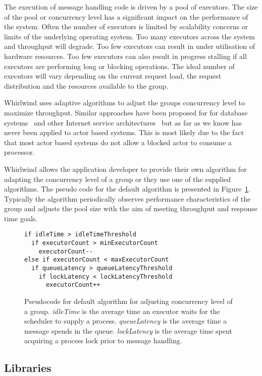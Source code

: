 \documentclass[conference]{IEEEtran}
\begin{document}
The execution of message handling code is driven by a pool of executors. The size of the pool or concurrency level has a significant impact on the performance of the system. Often the number of executors is limited by scalability concerns or limits of the underlying operating system. Too many executors across the system and throughput will degrade. Too few executors can result in under utilisation of hardware resources. Too few executors can also result in progress stalling if all executors are performing long or blocking operations. The ideal number of executors will vary depending on the current request load, the request distribution and the resources available to the group.

Whirlwind uses adaptive algorithms to adjust the groups concurrency level to maximize throughput. Similar approaches have been proposed for for database systems~\cite{Heiss:91:AdaptiveLoadControl} and other Internet service architectures~\cite{welsh03Adaptive} but as far as we know has never been applied to actor based systems. This is most likely due to the fact that most actor based systems do not allow a blocked actor to consume a processor.

Whirlwind allows the application developer to provide their own algorithm for adapting the concurrency level of a group or they use one of the supplied algorithms. The pseudo code for the default algorithm is presented in Figure~\ref{figure:epc}. Typically the algorithm periodically observes performance characteristics of the group and adjusts the pool size with the aim of meeting throughput and response time goals. 

\begin{figure}[ht]
\begin{verbatim}
if idleTime > idleTimeThreshold
  if executorCount > minExecutorCount
    executorCount--
else if executorCount < maxExecutorCount
  if queueLatency > queueLatencyThreshold
    if lockLatency < lockLatencyThreshold
      executorCount++
\end{verbatim}
\caption{Pseudocode for default algorithm for adjusting concurrency level of a group. \emph{idleTime} is the average time an executor waits for the scheduler to supply a process. \emph{queueLatency} is the average time a message spends in the queue. \emph{lockLatency} is the average time spent acquiring a process lock prior to message handling.}
\label{figure:epc}
\end{figure} 

\subsection{Libraries}
\end{document}
